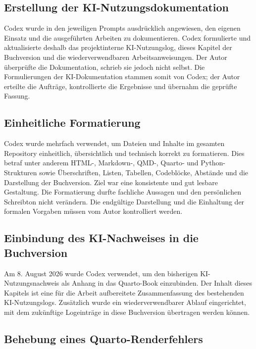 \documentclass[
  ngerman,
  a4paper,
  DIV=11,
  oneside]{scrreprt}
\begin{document}
\subsection{Erstellung der
KI-Nutzungsdokumentation}\label{erstellung-der-ki-nutzungsdokumentation}

Codex wurde in den jeweiligen Prompts ausdrücklich angewiesen, den
eigenen Einsatz und die ausgeführten Arbeiten zu dokumentieren. Codex
formulierte und aktualisierte deshalb das projektinterne KI-Nutzungslog,
dieses Kapitel der Buchversion und die wiederverwendbaren
Arbeitsanweisungen. Der Autor überprüfte die Dokumentation, schrieb sie
jedoch nicht selbst. Die Formulierungen der KI-Dokumentation stammen
somit von Codex; der Autor erteilte die Aufträge, kontrollierte die
Ergebnisse und übernahm die geprüfte Fassung.

\subsection{Einheitliche Formatierung}\label{einheitliche-formatierung}

Codex wurde mehrfach verwendet, um Dateien und Inhalte im gesamten
Repository einheitlich, übersichtlich und technisch korrekt zu
formatieren. Dies betraf unter anderem HTML-, Markdown-, QMD-, Quarto-
und Python-Strukturen sowie Überschriften, Listen, Tabellen, Codeblöcke,
Abstände und die Darstellung der Buchversion. Ziel war eine konsistente
und gut lesbare Gestaltung. Die Formatierung durfte fachliche Aussagen
und den persönlichen Schreibton nicht verändern. Die endgültige
Darstellung und die Einhaltung der formalen Vorgaben müssen vom Autor
kontrolliert werden.

\subsection{Einbindung des KI-Nachweises in die
Buchversion}\label{einbindung-des-ki-nachweises-in-die-buchversion}

Am 8. August 2026 wurde Codex verwendet, um den bisherigen
KI-Nutzungsnachweis als Anhang in das Quarto-Book einzubinden. Der
Inhalt dieses Kapitels ist eine für die Arbeit aufbereitete
Zusammenfassung des bestehenden KI-Nutzungslogs. Zusätzlich wurde ein
wiederverwendbarer Ablauf eingerichtet, mit dem zukünftige Logeinträge
in diese Buchversion übertragen werden können.

\subsection{Behebung eines
Quarto-Renderfehlers}\label{behebung-eines-quarto-renderfehlers}
\end{document}
